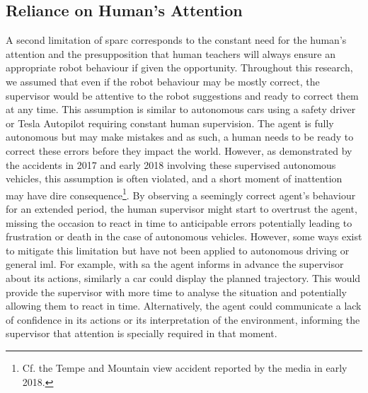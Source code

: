 \subsection{Reliance on Human's Attention}
A second limitation of \gls{sparc} corresponds to the constant need for the human's attention and the presupposition that human teachers will always ensure an appropriate robot behaviour if given the opportunity. Throughout this research, we assumed that even if the robot behaviour may be mostly correct, the supervisor would be attentive to the robot suggestions and ready to correct them at any time. This assumption is similar to autonomous cars using a safety driver or Tesla Autopilot requiring constant human supervision. The agent is fully autonomous but may make mistakes and as such, a human needs to be ready to correct these errors before they impact the world. However, as demonstrated by the accidents in 2017 and early 2018 involving these supervised autonomous vehicles, this assumption is often violated, and a short moment of inattention may have dire consequence\footnote{Cf. the Tempe and Mountain view accident reported by the media in early 2018.\label{foot:disc_danger}}. By observing a seemingly correct agent's behaviour for an extended period, the human supervisor might start to overtrust the agent, missing the occasion to react in time to anticipable errors potentially leading to frustration or death in the case of autonomous vehicles. However, some ways exist to mitigate this limitation but have not been applied to autonomous driving or general \gls{iml}. For example, with \gls{sa} the agent informs in advance the supervisor about its actions, similarly a car could display the planned trajectory. This would provide the supervisor with more time to analyse the situation and potentially allowing them to react in time. Alternatively, the agent could communicate a lack of confidence in its actions or its interpretation of the environment, informing the supervisor that attention is specially required in that moment.

